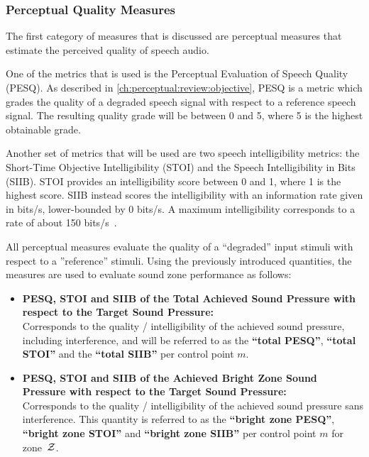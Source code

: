 \subsubsection{Perceptual Quality Measures}
The first category of measures that is discussed are perceptual measures that estimate the perceived 
quality of speech audio.

One of the metrics that is used is the Perceptual Evaluation of Speech Quality (PESQ).
As described in \autoref{ch:perceptual:review:objective}, PESQ is a metric which grades the quality of a 
degraded speech signal with respect to a reference speech signal.
The resulting quality grade will be between 0 and 5, where 5 is the highest obtainable grade.

Another set of metrics that will be used are two speech intelligibility metrics: 
the Short-Time Objective Intelligibility (STOI) and 
the Speech Intelligibility in Bits (SIIB).
STOI provides an intelligibility score between 0 and 1, where 1 is the highest score.
SIIB instead scores the intelligibility with an information rate given in bits/s, lower-bounded by 0 bits/s.
A maximum intelligibility corresponds to a rate of about 150 bits/s~\cite{van2017instrumental}.

All perceptual measures evaluate the quality of a ``degraded'' input stimuli with respect to a ''reference'' stimuli.
Using the previously introduced quantities, the measures are used to evaluate sound zone performance as follows:
\begin{itemize}
    \item \textbf{PESQ, STOI and SIIB of the Total Achieved Sound Pressure with 
        respect to the Target Sound Pressure:}\\
        Corresponds to the quality / intelligibility of the achieved sound pressure,
        including interference, and will be referred 
        to as the \textbf{``total PESQ''}, \textbf{``total STOI''} and the \textbf{``total SIIB''} per control point $m$. 
    \item \textbf{PESQ, STOI and SIIB of the Achieved Bright Zone Sound Pressure with 
        respect to the Target Sound Pressure:}\\
        Corresponds to the quality / intelligibility of the achieved sound pressure sans interference.
        This quantity is referred to as the \textbf{``bright zone PESQ''}, \textbf{``bright zone STOI''} and \textbf{``bright zone SIIB''}
        per control point $m$ for zone~$\mathcal{Z}$.
\end{itemize}

